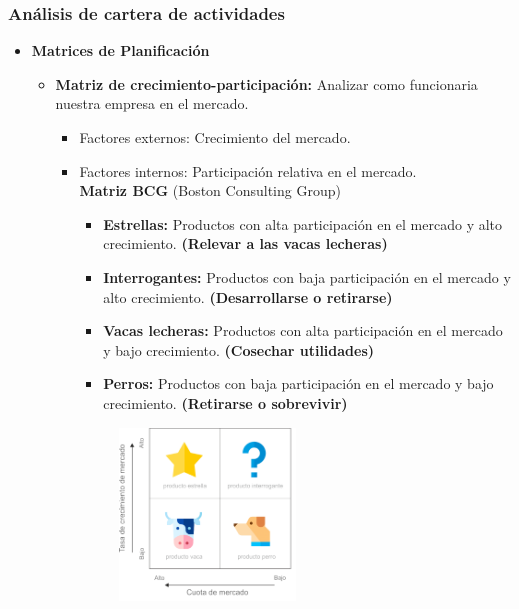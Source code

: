 \documentclass{templateNote}
\begin{document}
\subsubsection{Análisis de cartera de actividades}
    \begin{itemize}
        \item \textbf{Matrices de Planificación}
        \begin{itemize}
            \item \textbf{Matriz de crecimiento-participación:} Analizar como funcionaria nuestra empresa en el mercado.
            \begin{itemize}
                \item Factores externos: Crecimiento del mercado.
                \item Factores internos: Participación relativa en el mercado. \\
                \noindent\textbf{Matriz BCG} (Boston Consulting Group)
                \begin{itemize}
                    \item \textbf{Estrellas:} Productos con alta participación en el mercado y alto crecimiento. \textbf{(Relevar a las vacas lecheras)}
                    \item \textbf{Interrogantes:} Productos con baja participación en el mercado y alto crecimiento. \textbf{(Desarrollarse o retirarse)}
                    \item \textbf{Vacas lecheras:} Productos con alta participación en el mercado y bajo crecimiento. \textbf{(Cosechar utilidades)}
                    \item \textbf{Perros:} Productos con baja participación en el mercado y bajo crecimiento. \textbf{(Retirarse o sobrevivir)}
                \end{itemize}
                \begin{figure}[H]
                    \centering
                    \includegraphics[width=0.5\textwidth]{img/matriz_bcg-768x803.png}

\end{figure}
\end{itemize}
\end{itemize}
\end{itemize}
\end{document}
